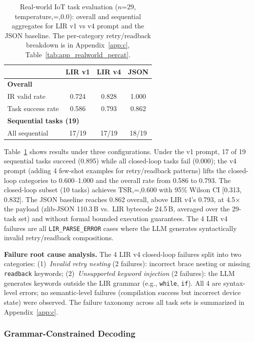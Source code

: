 \documentclass[a4paper,fleqn,longmktitle]{cas-dc}
\begin{document}
\begin{table}[t]
\centering
\caption{Real-world IoT task evaluation ($n$=29, temperature,=,0.0): overall and sequential aggregates for LIR v1 vs v4 prompt and the JSON baseline. The per-category retry/readback breakdown is in Appendix~\ref{app:c}, Table~\ref{tab:app_realworld_percat}.}
\label{tab:realworld}
\footnotesize
\begin{tabular}{lccc}
\toprule
 & LIR v1 & LIR v4 & JSON \\
\midrule
\multicolumn{4}{l}{\textbf{Overall}} \\
IR valid rate & 0.724 & 0.828 & 1.000 \\
Task success rate & 0.586 & 0.793 & 0.862 \\
\midrule
\multicolumn{4}{l}{\textbf{Sequential tasks (19)}} \\
All sequential & 17/19 & 17/19 & 18/19 \\
\bottomrule
\end{tabular}
\end{table}

Table~\ref{tab:realworld} shows results under three configurations. Under the v1 prompt, 17 of 19 sequential tasks succeed (0.895) while all closed-loop tasks fail (0.000); the v4 prompt (adding 4 few-shot examples for retry/readback patterns) lifts the closed-loop categories to 0.600--1.000 and the overall rate from 0.586 to 0.793. The closed-loop subset (10 tasks) achieves TSR,=,0.600 with 95\% Wilson CI [0.313, 0.832]. The JSON baseline reaches 0.862 overall, above LIR v4's 0.793, at 4.5$\times$ the payload (zlib-JSON 110.3\,B vs.\ LIR bytecode 24.5\,B, averaged over the 29-task set) and without formal bounded execution guarantees. The 4 LIR v4 failures are all \texttt{LIR\_PARSE\_ERROR} cases where the LLM generates syntactically invalid retry/readback compositions.

\noindent\textbf{Failure root cause analysis.} The 4 LIR v4 closed-loop failures split into two categories: (1)~\emph{Invalid retry nesting} (2 failures): incorrect brace nesting or missing \texttt{readback} keywords; (2)~\emph{Unsupported keyword injection} (2 failures): the LLM generates keywords outside the LIR grammar (e.g., \texttt{while}, \texttt{if}). All 4 are syntax-level errors; no semantic-level failures (compilation success but incorrect device state) were observed. The failure taxonomy across all task sets is summarized in Appendix~\ref{app:c}.

\subsubsection{Grammar-Constrained Decoding}
\label{sec:res_grammar}
\end{document}
